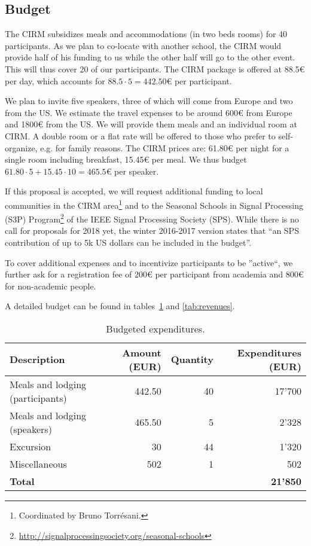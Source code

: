 \documentclass[a4paper]{scrartcl}
\begin{document}
\subsection{Budget}

The CIRM subsidizes meals and accommodations (in two beds rooms) for 40
participants. As we plan to co-locate with another school, the CIRM would
provide half of his funding to us while the other half will go to the other
event. This will thus cover 20 of our participants. The CIRM package is offered
at 88.5€ per day, which accounts for $88.5 \cdot 5 = 442.50$€ per participant.

We plan to invite five speakers, three of which will come from Europe and two
from the US. We estimate the travel expenses to be around 600€ from Europe and
1800€ from the US. We will provide them meals and an individual room at CIRM.  A
double room or a flat rate will be offered to those who prefer to self-organize,
e.g. for family reasons. The CIRM prices are: 61.80€ per night for a single room
including breakfast, 15.45€ per meal. We thus budget $61.80 \cdot 5 + 15.45
\cdot 10 = 465.5$€ per speaker.

If this proposal is accepted, we will request additional funding to local
communities in the CIRM area\footnote{Coordinated by Bruno Torrésani.} and to
the Seasonal Schools in Signal Processing (S3P)
Program\footnote{\url{http://signalprocessingsociety.org/seasonal-schools}} of
the IEEE Signal Processing Society (SPS). While there is no call for proposals
for 2018 yet, the winter 2016-2017 version states that ``an SPS contribution of
up to 5k US dollars can be included in the budget''.

To cover additional expenses and to incentivize participants to be ''active``,
we further ask for a registration fee of 200€ per participant from academia and
800€ for non-academic people.

A detailed budget can be found in tables~\ref{tab:expenditures} and
\ref{tab:revenues}.

\begin{table}[ht]
	\centering
	\begin{tabular}{|l|r|r|r|}
	\hline
	Description & Amount (EUR) & Quantity & Expenditures (EUR) \\
	\hline
	Meals and lodging (participants) &  442.50 & 40 & 17'700 \\
	Meals and lodging (speakers)     &  465.50 &  5 &  2'328 \\
	Excursion                        &   30    & 44 &  1'320 \\
	Miscellaneous                    &  502    &  1 &    502 \\
	\hline
	\multicolumn{3}{|l|}{\textbf{Total}} & \textbf{21'850} \\
	\hline
	\end{tabular}
	\caption{Budgeted expenditures.}
	\label{tab:expenditures}
\end{table}
\end{document}
